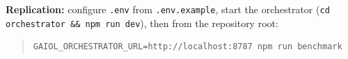 \documentclass{iopjournal}
\begin{document}
\noindent\textbf{Replication:} configure \texttt{.env} from \texttt{.env.example}, start the orchestrator (\texttt{cd orchestrator \&\& npm run dev}), then from the repository root:
\begin{quote}\small
\begin{verbatim}
GAIOL_ORCHESTRATOR_URL=http://localhost:8787 npm run benchmark
\end{verbatim}
\end{quote}




\end{document}
